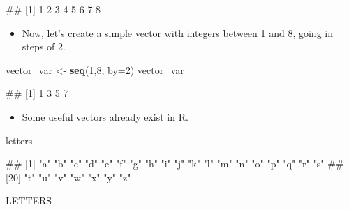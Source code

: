 \documentclass[
]{book}
\newenvironment{Shaded}{\begin{snugshade}}{\end{snugshade}}
\newcommand{\AttributeTok}[1]{\textcolor[rgb]{0.13,0.29,0.53}{#1}}
\newcommand{\DecValTok}[1]{\textcolor[rgb]{0.00,0.00,0.81}{#1}}
\newcommand{\FunctionTok}[1]{\textcolor[rgb]{0.13,0.29,0.53}{\textbf{#1}}}
\newcommand{\NormalTok}[1]{#1}
\newcommand{\OtherTok}[1]{\textcolor[rgb]{0.56,0.35,0.01}{#1}}
\providecommand{\tightlist}{%
  \setlength{\itemsep}{0pt}\setlength{\parskip}{0pt}}
\begin{document}
\begin{Shaded}
\begin{Highlighting}[]
\NormalTok{\#\# [1] 1 2 3 4 5 6 7 8}
\end{Highlighting}
\end{Shaded}

\begin{itemize}
\tightlist
\item
  Now, let's create a simple vector with integers between 1 and 8, going in steps of 2.
\end{itemize}

\begin{Shaded}
\begin{Highlighting}[]
\NormalTok{vector\_var }\OtherTok{\textless{}{-}} \FunctionTok{seq}\NormalTok{(}\DecValTok{1}\NormalTok{,}\DecValTok{8}\NormalTok{, }\AttributeTok{by=}\DecValTok{2}\NormalTok{)}
\NormalTok{vector\_var}
\end{Highlighting}
\end{Shaded}

\begin{Shaded}
\begin{Highlighting}[]
\NormalTok{\#\# [1] 1 3 5 7}
\end{Highlighting}
\end{Shaded}

\begin{itemize}
\tightlist
\item
  Some useful vectors already exist in R.
\end{itemize}

\begin{Shaded}
\begin{Highlighting}[]
\NormalTok{letters}
\end{Highlighting}
\end{Shaded}

\begin{Shaded}
\begin{Highlighting}[]
\NormalTok{\#\#  [1] "a" "b" "c" "d" "e" "f" "g" "h" "i" "j" "k" "l" "m" "n" "o" "p" "q" "r" "s"}
\NormalTok{\#\# [20] "t" "u" "v" "w" "x" "y" "z"}
\end{Highlighting}
\end{Shaded}

\begin{Shaded}
\begin{Highlighting}[]
\NormalTok{LETTERS}
\end{Highlighting}
\end{Shaded}
\end{document}
